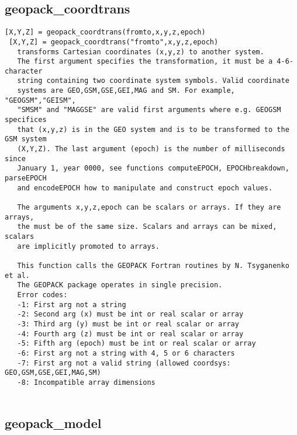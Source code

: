 \documentclass[a4paper]{article}
\begin{document}
\subsection{geopack\_coordtrans\label{geopack_coordtrans}}

\begin{tscreen}
\begin{verbatim}
[X,Y,Z] = geopack_coordtrans(fromto,x,y,z,epoch)
 [X,Y,Z] = geopack_coordtrans("fromto",x,y,z,epoch)
   transforms Cartesian coordinates (x,y,z) to another system.
   The first argument specifies the transformation, it must be a 4-6-character
   string containing two coordinate system symbols. Valid coordinate
   systems are GEO,GSM,GSE,GEI,MAG and SM. For example, "GEOGSM","GEISM",
   "SMSM" and "MAGGSE" are valid first arguments where e.g. GEOGSM specifices
   that (x,y,z) is in the GEO system and is to be transformed to the GSM system
   (X,Y,Z). The last argument (epoch) is the number of milliseconds since
   January 1, year 0000, see functions computeEPOCH, EPOCHbreakdown, parseEPOCH
   and encodeEPOCH how to manipulate and construct epoch values.

   The arguments x,y,z,epoch can be scalars or arrays. If they are arrays,
   the must be of the same size. Scalars and arrays can be mixed, scalars
   are implicitly promoted to arrays.

   This function calls the GEOPACK Fortran routines by N. Tsyganenko et al.
   The GEOPACK package operates in single precision.
   Error codes:
   -1: First arg not a string
   -2: Second arg (x) must be int or real scalar or array
   -3: Third arg (y) must be int or real scalar or array
   -4: Fourth arg (z) must be int or real scalar or array
   -5: Fifth arg (epoch) must be int or real scalar or array
   -6: First arg not a string with 4, 5 or 6 characters
   -7: First arg not a valid string (allowed coordsys: GEO,GSM,GSE,GEI,MAG,SM)
   -8: Incompatible array dimensions
 
\end{verbatim}
\end{tscreen}





\subsection{geopack\_model\label{geopack_model}}
\end{document}

